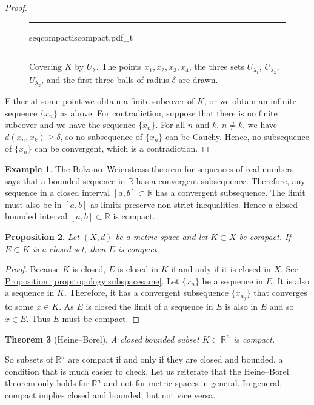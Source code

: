 \documentclass[12pt,openany]{book}
\newcommand{\R}{{\mathbb{R}}}
\theoremstyle{plain}
\newtheorem{thm}{Theorem}[section]
\newtheorem{prop}[thm]{Proposition}
\theoremstyle{remark}
\theoremstyle{definition}
\newenvironment{myfig}{%
\begin{figure}[h!t]
\noindent\rule{\textwidth}{0.5pt}\vspace{12pt}\par\centering}%
{\par\noindent\rule{\textwidth}{0.5pt}
\end{figure}}
\theoremstyle{exercise}
\theoremstyle{example}
\newtheorem{example}[thm]{Example}
\newcommand{\propref}[1]{\hyperref[#1]{Proposition~\ref*{#1}}}
\begin{document}
\begin{proof}
\begin{myfig}
{seqcompactiscompact.pdf_t}
\caption{Covering $K$ by $U_{\lambda}$.  The points
$x_1,x_2,x_3,x_4$, 
the three sets 
$U_{\lambda_1}$,
$U_{\lambda_2}$,
$U_{\lambda_2}$,
and 
the first three balls
of radius $\delta$ are drawn.\label{fig:seqcompactiscompact}}
\end{myfig}

Either at some point we obtain a finite subcover of $K$,
or we obtain an
infinite
sequence $\{ x_n \}$ as above.
For contradiction, suppose that
there is no finite subcover and we have the sequence $\{ x_n \}$.
For all $n$ and $k$, $n \not= k$, 
we have $d(x_n,x_k) \geq \delta$,
so no subsequence of $\{ x_n \}$ can be
Cauchy.  Hence, no subsequence of $\{ x_n \}$ can be convergent,
which is a contradiction.
\end{proof}

\begin{example}
The Bolzano--Weierstrass theorem for sequences of real numbers
says that a bounded sequence in $\R$ has a convergent
subsequence.  Therefore, any sequence in a closed interval $[a,b] \subset \R$ has 
a convergent subsequence.  The limit must also be in $[a,b]$ as limits
preserve non-strict inequalities.  Hence a closed bounded interval $[a,b]
\subset \R$ is compact.
\end{example}

\begin{prop}
Let $(X,d)$ be a metric space and let $K \subset X$ be compact.  If
$E \subset K$ is a closed set, then $E$ is compact.
\end{prop}

\begin{proof}
Because $K$ is closed, $E$ is closed in $K$ if
and only if it is closed in $X$.
See \propref{prop:topology:subspacesame}.
Let $\{ x_n \}$ be a sequence in $E$.  It is also a sequence in $K$.
Therefore, it has a convergent subsequence $\{ x_{n_j} \}$ that converges to
some $x \in K$.  As $E$ is closed the limit of a sequence in $E$ is also in $E$
and so $x \in E$.  Thus $E$ must be compact.
\end{proof}

\begin{thm}[Heine--Borel] 
\label{thm:msbw}
A closed bounded subset $K \subset \R^n$ is compact.
\end{thm}

So subsets of $\R^n$ are compact if and only if they are closed and bounded,
a condition that is much easier to check.
Let us reiterate that the Heine--Borel theorem only holds for $\R^n$ and not
for metric spaces in general.  In general, compact implies closed and
bounded, but not vice versa.
\end{document}
